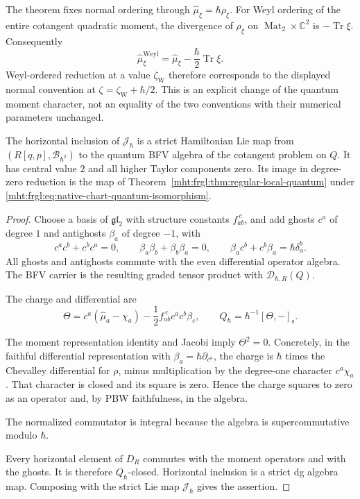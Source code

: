 The theorem fixes normal ordering through
$\widehat\mu_\xi=\hbar\rho_\xi$.
For Weyl ordering of the entire cotangent quadratic moment,
the divergence of $\rho_\xi$ on
$\operatorname{Mat}_2\times\mathbb C^2$ is
$-\operatorname{Tr}\xi$.  Consequently
\[
 \widehat\mu_\xi^{\mathrm{Weyl}}
       =\widehat\mu_\xi-\frac\hbar2\operatorname{Tr}\xi.
\]
Weyl-ordered reduction at a value $\zeta_{\mathrm W}$
therefore corresponds to the displayed normal convention
at $\zeta=\zeta_{\mathrm W}+\hbar/2$.
This is an explicit change of the quantum moment character,
not an equality of the two conventions with their numerical
parameters unchanged.

\begin{corollary}
\label{mht:frgl:cor:local-quantum-bfv-arrow}
The horizontal inclusion of $\mathcal J_\hbar$ is a strict Hamiltonian
Lie map from $(R[q,p],\mathcal B_{\hbar^2})$ to the quantum BFV algebra
of the cotangent problem on $Q$.
It has central value $2$ and all higher Taylor components
zero.  Its image in degree-zero reduction is the map of
Theorem~\ref{mht:frgl:thm:regular-local-quantum} under
\eqref{mht:frgl:eq:native-chart-quantum-isomorphism}.
\end{corollary}

\begin{proof}
Choose a basis of $\mathfrak{gl}_2$ with structure constants
$f_{ab}^{\ c}$, and add ghosts $c^a$ of degree $1$ and
antighosts $\beta_a$ of degree $-1$, with
\[
 c^ac^b+c^bc^a=0,\qquad
 \beta_a\beta_b+\beta_b\beta_a=0,\qquad
 \beta_a c^b+c^b\beta_a=\hbar\delta_a^b.
\]
All ghosts and antighosts commute with the even differential
operator algebra.  The BFV carrier is the resulting graded
tensor product with $\mathscr D_{\hbar,R}(Q)$.

The charge and differential are
\[
 \Theta=c^a(\widehat\mu_a-\chi_a)
      -\frac12 f_{ab}^{\ c}c^ac^b\beta_c,
 \qquad Q_\hbar=\hbar^{-1}[\Theta,-]_{\mathrm s}.
\]

The moment representation identity and Jacobi imply
$\Theta^2=0$.  Concretely, in the faithful differential
representation with $\beta_a=\hbar\partial_{c^a}$,
the charge is $\hbar$ times the Chevalley differential
for $\rho$, minus multiplication by the degree-one
character $c^a\chi_a$.  That character is closed and
its square is zero.  Hence the charge squares to zero
as an operator and, by PBW faithfulness, in the algebra.

The normalized commutator is integral because the
algebra is supercommutative modulo $\hbar$.

Every horizontal element of $D_R$ commutes with the
moment operators and with the ghosts.  It is therefore
$Q_\hbar$-closed.  Horizontal inclusion is a strict
dg algebra map.  Composing with the strict Lie map
$\mathcal J_\hbar$ gives the assertion.
\end{proof}

